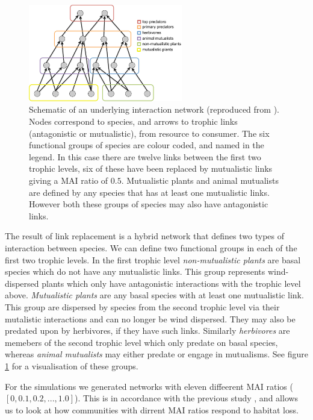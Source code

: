 \begin{figure}
	\centering
	\includegraphics[width=0.6\textwidth]{"diagrams/trophic_cartoon"}
	\caption{Schematic of an underlying interaction network (reproduced from \cite{lurgi2015effects}). Nodes correspond to species, and arrows to trophic links (antagonistic or mutualistic), from resource to consumer. The six functional groups of species are colour coded, and named in the legend. In this case there are twelve links between the first two trophic levels, six of these have been replaced by mutualistic links giving a MAI ratio of $0.5$. Mutualistic plants and animal mutualists are defined by any species that has at least one mutualistic links. However both these groups of species may also have antagonistic links.}
	\label{fig:trophic_cartoon}
\end{figure}

The result of link replacement is a hybrid network that defines two types of interaction between species. We can define  two functional groups in each of the first two trophic levels. In the first trophic level \emph{non-mutualistic plants} are basal species which do not have any mutualistic links. This group represents wind-dispersed plants which only have antagonistic interactions with the trophic level above. \emph{Mutualistic plants} are any basal species with at least one mutualistic link. This group are dispersed by species from the second trophic level via their mutalistic interactions and can no longer be wind dispersed. They may also be predated upon by herbivores, if they have such links. Similarly \emph{herbivores} are memebers of the second trophic level which only predate on basal species, whereas \emph{animal mutualists} may either predate or engage in mutualisms. See figure \ref{fig:trophic_cartoon} for a visualisation of these groups. 

For the simulations we generated networks with eleven diffeerent MAI ratios ($[0,0.1,0.2,...,1.0]$). This is in accordance with the previous study \cite{lurgi2015effects}, and allows us to look at how communities with dirrent MAI ratios respond to habitat loss. 


